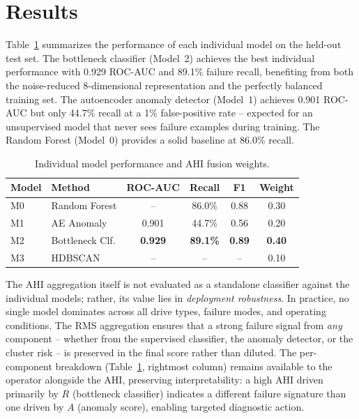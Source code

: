 \documentclass[sigconf,natbib=false, language=english]{acmart}
\begin{document}
\section{Results}
\label{sec:results}

Table~\ref{tab:results} summarizes the performance of each individual model on the held-out test set. The bottleneck classifier (Model~2) achieves the best individual performance with 0.929 ROC-AUC and 89.1\% failure recall, benefiting from both the noise-reduced 8-dimensional representation and the perfectly balanced training set. The autoencoder anomaly detector (Model~1) achieves 0.901 ROC-AUC but only 44.7\% recall at a 1\% false-positive rate -- expected for an unsupervised model that never sees failure examples during training. The Random Forest (Model~0) provides a solid baseline at 86.0\% recall.

\begin{table}[h]
  \caption{Individual model performance and AHI fusion weights.}
  \label{tab:results}
  \begin{tabular}{llcccc}
    \toprule
    Model & Method & ROC-AUC & Recall & F1 & Weight \\
    \midrule
    M0 & Random Forest & -- & 86.0\% & 0.88 & 0.30 \\
    M1 & AE Anomaly & 0.901 & 44.7\% & 0.56 & 0.20 \\
    M2 & Bottleneck Clf. & \textbf{0.929} & \textbf{89.1\%} & \textbf{0.89} & \textbf{0.40} \\
    M3 & HDBSCAN & -- & -- & -- & 0.10 \\
    \bottomrule
  \end{tabular}
\end{table}

The AHI aggregation itself is not evaluated as a standalone classifier against the individual models; rather, its value lies in \emph{deployment robustness}. In practice, no single model dominates across all drive types, failure modes, and operating conditions. The RMS aggregation ensures that a strong failure signal from \emph{any} component -- whether from the supervised classifier, the anomaly detector, or the cluster risk -- is preserved in the final score rather than diluted. The per-component breakdown (Table~\ref{tab:results}, rightmost column) remains available to the operator alongside the AHI, preserving interpretability: a high AHI driven primarily by $R$ (bottleneck classifier) indicates a different failure signature than one driven by $A$ (anomaly score), enabling targeted diagnostic action.
\end{document}
